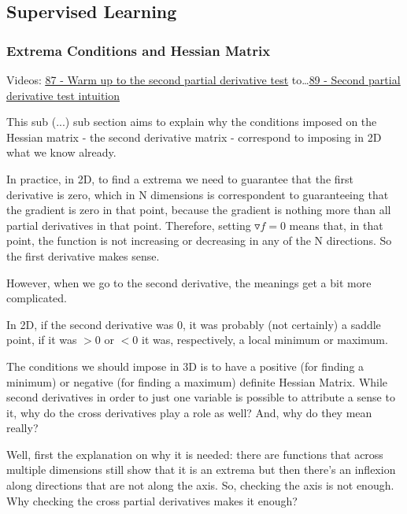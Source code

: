 \subsection{Supervised Learning}





\subsubsection*{Extrema Conditions and Hessian Matrix}

Videos: \href{https://www.youtube.com/watch?v=nRJM4mY-Pq0&list=PLSQl0a2vh4HC5feHa6Rc5c0wbRTx56nF7&index=87}{\ul{87 - Warm up to the second partial derivative test}} to\dots \href{https://www.youtube.com/watch?v=sJo7D74PAak&list=PLSQl0a2vh4HC5feHa6Rc5c0wbRTx56nF7&index=89}{\ul{89 - Second partial derivative test intuition}}




This sub (...) sub section aims to explain why the conditions imposed on the Hessian matrix - the second derivative matrix - correspond to imposing in 2D what we know already.

In practice, in 2D, to find a extrema we need to guarantee that the first derivative is zero, which in N dimensions is correspondent to guaranteeing that the gradient is zero in that point, because the gradient is nothing more than all partial derivatives in that point. Therefore, setting $\triangledown f = 0$ means that, in that point, the function is not increasing or decreasing in any of the N directions. So the first derivative makes sense.

However, when we go to the second derivative, the meanings get a bit more complicated.

In 2D, if the second derivative was 0, it was probably (not certainly) a saddle point, if it was $> 0$ or $< 0$ it was, respectively, a local minimum or maximum.

The conditions we should impose in 3D is to have a positive (for finding a minimum) or negative (for finding a maximum) definite Hessian Matrix. While second derivatives in order to just one variable is possible to attribute a sense to it, why do the cross derivatives play a role as well? And, why do they mean really?

Well, first the explanation on why it is needed: there are functions that across multiple dimensions still show that it is an extrema but then there's an inflexion along directions that are not along the axis. So, checking the axis is not enough. Why checking the cross partial derivatives makes it enough?

